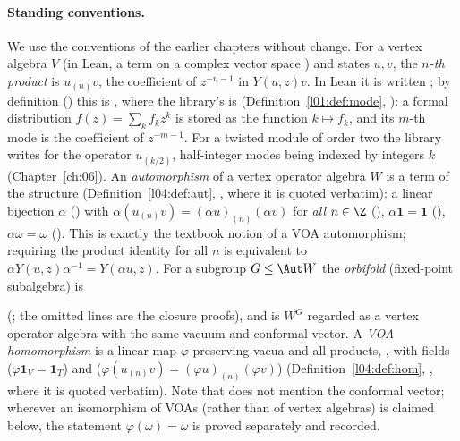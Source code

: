 \paragraph{Standing conventions.}  We use the conventions of the earlier chapters without change.
For a vertex algebra $V$ (in Lean, a term  on a complex vector
space ) and states $u,v$, the \emph{$n$-th product} is
$u_{(n)}v$, the coefficient of $z^{-n-1}$ in $Y(u,z)v$.  In Lean it is written
; by definition () this is
, where the library's  is 
(Definition~\ref{l01:def:mode}, ): a formal distribution $f(z)=\sum_k f_k z^k$ is
stored as the function $k\mapsto f_k$, and its $m$-th mode is the coefficient of $z^{-m-1}$.
For a twisted module of order two the library writes  for the operator
$u_{(k/2)}$, half-integer modes being indexed by integers $k$ (Chapter~\ref{ch:06}).  An
\emph{automorphism} of a vertex operator algebra $W$ is a term of the structure 
(Definition~\ref{l04:def:aut}, , where it is quoted verbatim):
a linear bijection $\alpha$ () with
$\alpha(u_{(n)}v)=(\alpha u)_{(n)}(\alpha v)$ for \emph{all} $n\in\Z$ (),
$\alpha\mathbf 1=\mathbf 1$ (),
$\alpha\omega=\omega$ ().  This is exactly the textbook notion of a VOA automorphism; requiring
the product identity for all $n$ is equivalent to $\alpha Y(u,z)\alpha^{-1}=Y(\alpha u,z)$.  For a
subgroup $G\le\Aut W$ the \emph{orbifold} (fixed-point subalgebra) is
\begin{leancode}
def orbifold (G : Subgroup (Aut W)) : VOASubalgebra W where
  carrier :=
    { carrier := {v | ∀ g ∈ G, g v = v}
      ...
\end{leancode}
(; the omitted lines are the closure proofs), and
 is $W^G$ regarded as a vertex operator algebra with the same vacuum and
conformal vector.  A \emph{VOA homomorphism} is a linear map $\varphi$ preserving vacua and all products,
, with fields  ($\varphi\mathbf 1_V=\mathbf 1_T$) and
 ($\varphi(u_{(n)}v)=(\varphi u)_{(n)}(\varphi v)$) (Definition~\ref{l04:def:hom},
, where it is quoted verbatim).  Note that  does not mention the conformal
vector; wherever an isomorphism of VOAs (rather than of vertex algebras) is claimed below, the
statement $\varphi(\omega)=\omega$ is proved separately and recorded.

